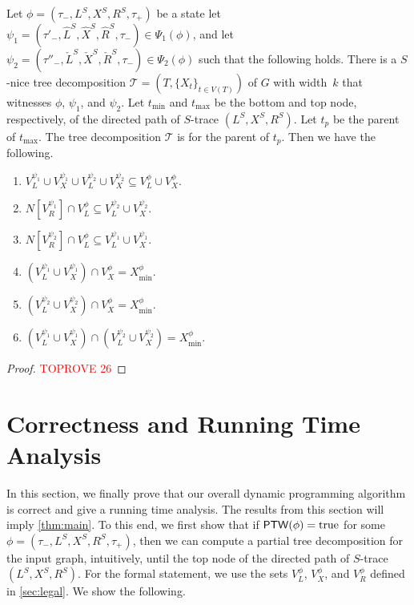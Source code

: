 \documentclass[a4paper,UKenglish,cleveref, autoref, thm-restate, numberwithinsect]{lipics-v2021}
\newcounter{algorithm}
\newcommand{\ptw}{\mathsf{PTW}}
\newcommand{\true}{\textup{true}}
\newcommand{\slim}{\text{slim}\xspace}
\newcommand{\topheavy}{\text{top-heavy}\xspace}
\begin{document}
\begin{lemma}\label{lem:legal2}
Let $\phi=(\tau_-,L^S, X^S, R^S,\tau_+)$ be a state let $\psi_1=(\tau'_-,\hat{L}^S, \hat{X}^S, \hat{R}^S,\tau_-)\in\Psi_1(\phi)$, and let $\psi_2=(\tau''_-,\check{L}^S, \check{X}^S, \check{R}^S,\tau_-)\in\Psi_2(\phi)$ such that the following holds.
There is a \slim $S$-nice tree decomposition $\mathcal{T}=(T,\{X_t\}_{t\in V(T)})$ of $G$ with width~$k$ that witnesses $\phi$, $\psi_1$, and $\psi_2$. Let $t_{\min}$ and $t_{\max}$ be the bottom and top node, respectively, of the directed path of $S$-trace $(L^S, X^S, R^S)$. Let $t_p$ be the parent of $t_{\max}$. 
The tree decomposition $\mathcal{T}$ is \topheavy for the parent of $t_p$.
Then we have the following.
\begin{enumerate}
\item $V^{\psi_1}_L\cup V^{\psi_1}_X\cup V^{\psi_2}_L\cup V^{\psi_2}_X \subseteq V^\phi_L\cup V^\phi_X$.
\item $N[V^{\psi_1}_R]\cap V^\phi_L\subseteq V^{\psi_2}_L\cup V^{\psi_2}_X$.
\item $N[V^{\psi_2}_R]\cap V^\phi_L\subseteq V^{\psi_1}_L\cup V^{\psi_1}_X$.
\item $(V^{\psi_1}_L\cup V^{\psi_1}_X)\cap V^\phi_X= X^\phi_{\min}$.
\item $(V^{\psi_2}_L\cup V^{\psi_2}_X)\cap V^\phi_X= X^\phi_{\min}$.
\item $(V^{\psi_1}_L\cup V^{\psi_1}_X)\cap (V^{\psi_2}_L\cup V^{\psi_2}_X)= X^\phi_{\min}$.
\end{enumerate}
\end{lemma}
\begin{proof}\textcolor{red}{TOPROVE 26}\end{proof}







\section{Correctness and Running Time Analysis}\label{sec:correct}



In this section, we finally prove that our overall dynamic programming algorithm is correct and give a running time analysis. The results from this section will imply \cref{thm:main}. To this end, we first show that if $\ptw(\phi)=\true$ for some $\phi=(\tau_-,L^S, X^S, R^S,\tau_+)$, then we can compute a partial tree decomposition for the input graph, intuitively, until the top node of the directed path of $S$-trace $(L^S, X^S, R^S)$. For the formal statement, we use the sets $V^\phi_L$, $V^\phi_X$, and $V^\phi_R$ defined in \cref{sec:legal}. We show the following.
\end{document}
